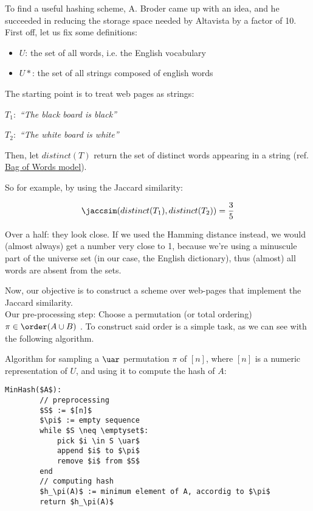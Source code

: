 	To find a useful hashing scheme, A. Broder came up with an idea, and he succeeded in reducing the storage space needed by Altavista by a factor of 10.\\
	First off, let us fix some definitions:
	\begin{itemize}
	\item $U$: the set of all words, i.e. the English vocabulary
	\item $U*$: the set of all strings composed of english words
	\end{itemize}
	
	The starting point is to treat web pages as strings:
	
	$T_1:$ \textit{``The black board is black''}
	
	$T_2:$ \textit{``The white board is white''}
	
	Then, let $distinct(T)$ return the set of distinct words appearing in a string (ref. \href{https://en.wikipedia.org/wiki/Bag-of-words_model}{Bag of Words model}).
	
	So for example, by using the Jaccard similarity:
    
    \begin{equation}
    \jaccsim(distinct(T_1), distinct(T_2))= \frac{3}{5}
    \end{equation}
	
	Over a half: they look close. If we used the Hamming distance instead, we would (almost always) get a number very close to 1, because we're using a minuscule part of the universe set (in our case, the English dictionary), thus (almost) all words are absent from the sets.
	
	Now, our objective is to construct a scheme over web-pages that implement the Jaccard similarity.\\
	Our pre-processing step: Choose a permutation (or total ordering) $\pi \in \order(A \cup B)$ \uar. To construct said order is a simple task, as we can see with the following algorithm.
	
	\newpage
	Algorithm for sampling a $\uar$ permutation $\pi$ of $[n]$, where $[n]$ is a numeric representation of $U$, and using it to compute the hash of $A$:
	\begin{lstlisting}[caption={min hash or shingles algorithm},label={lst:min_hash}]
	MinHash($A$):
	    // preprocessing
	    $S$ := $[n]$
	    $\pi$ := empty sequence
	    while $S \neq \emptyset$:
	        pick $i \in S \uar$
	        append $i$ to $\pi$
	        remove $i$ from $S$
	    end
	    // computing hash
	    $h_\pi(A)$ := minimum element of A, accordig to $\pi$
	    return $h_\pi(A)$
	\end{lstlisting}
	
